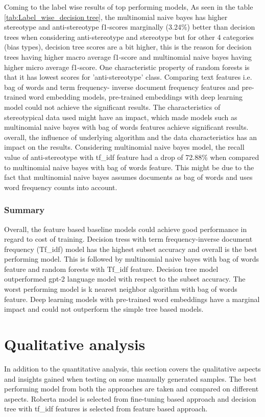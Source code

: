 Coming to the label wise results of top performing models, As seen in the table \ref{tab:Label_wise_decision tree}, the multinomial naive bayes has higher stereotype and anti-stereotype f1-scores marginally (3.24\%) better than decision trees when considering anti-stereotype and stereotype but for other 4 categories (bias types), decision tree scores are a bit higher, this is the reason for decision trees having higher macro average f1-score and multinomial naive bayes having higher micro average f1-score. One characteristic property of random forests is that it has lowest scores for 'anti-stereotype' class. Comparing text features i.e. bag of words and term frequency- inverse document frequency features and pre-trained word embedding models, pre-trained embeddings with deep learning model could not achieve the significant results. The characteristics of stereotypical data used might have an impact, which made models such as multinomial naive bayes with bag of words features achieve significant results. overall, the influence of underlying algorithm and the data characteristics has an impact on the results. Considering multinomial naive bayes model, the recall value of anti-stereotype with tf\_idf feature had a drop of 72.88\% when compared to multinomial naive bayes with bag of words feature. This might be due to the fact that multinomial naive bayes assumes documents as bag of words and uses word frequency counts into account.

\subsubsection{Summary}
Overall, the feature based baseline models could achieve good performance in regard to cost of training. Decision tress with term frequency-inverse document frequency (Tf\_idf) model has the highest subset accuracy and overall is the best performing model. This is followed by multinomial naive bayes with bag of words feature and random forests with Tf\_idf feature. Decision tree model outperformed gpt-2 language model with respect to the subset accuracy. The worst performing model is k nearest neighbor algorithm with bag of words feature. Deep learning models with pre-trained word embeddings have a marginal impact and could not outperform the simple tree based models. 

\pagebreak

\section{Qualitative analysis} \label{Qualitative_analysis}
In addition to the quantitative analysis, this section covers the qualitative aspects and insights gained when testing on some manually generated samples. The best performing model from both the approaches are taken and compared on different aspects. Roberta model is selected from fine-tuning based approach and decision tree with tf\_idf features is selected from feature based approach.

